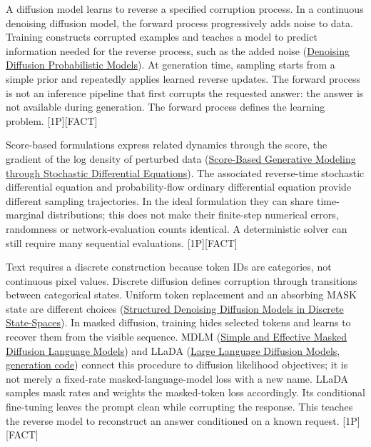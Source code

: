 A diffusion model learns to reverse a specified corruption process. In a
continuous denoising diffusion model, the forward process progressively
adds noise to data. Training constructs corrupted examples and teaches a
model to predict information needed for the reverse process, such as the
added noise (\href{https://arxiv.org/abs/2006.11239}{Denoising Diffusion
Probabilistic Models}). At generation time, sampling starts from a
simple prior and repeatedly applies learned reverse updates. The forward
process is not an inference pipeline that first corrupts the requested
answer: the answer is not available during generation. The forward
process defines the learning problem. \mbox{{[}1P{]}}\hspace{0pt}\mbox{{[}FACT{]}}

Score-based formulations express related dynamics through the score, the
gradient of the log density of perturbed data
(\href{https://arxiv.org/abs/2011.13456}{Score-Based Generative Modeling
through Stochastic Differential Equations}). The associated reverse-time
stochastic differential equation and probability-flow ordinary
differential equation provide different sampling trajectories. In the
ideal formulation they can share time-marginal distributions; this does
not make their finite-step numerical errors, randomness or
network-evaluation counts identical. A deterministic solver can still
require many sequential evaluations. \mbox{{[}1P{]}}\hspace{0pt}\mbox{{[}FACT{]}}

Text requires a discrete construction because token IDs are categories,
not continuous pixel values. Discrete diffusion defines corruption
through transitions between categorical states. Uniform token
replacement and an absorbing MASK state are different choices
(\href{https://arxiv.org/abs/2107.03006}{Structured Denoising Diffusion
Models in Discrete State-Spaces}). In masked diffusion, training hides
selected tokens and learns to recover them from the visible sequence.
MDLM (\href{https://arxiv.org/abs/2406.07524}{Simple and Effective
Masked Diffusion Language Models}) and LLaDA
(\href{https://arxiv.org/abs/2502.09992}{Large Language Diffusion
Models}, \href{https://github.com/ML-GSAI/LLaDA}{generation code})
connect this procedure to diffusion likelihood objectives; it is not
merely a fixed-rate masked-language-model loss with a new name. LLaDA
samples mask rates and weights the masked-token loss accordingly. Its
conditional fine-tuning leaves the prompt clean while corrupting the
response. This teaches the reverse model to reconstruct an answer
conditioned on a known request. \mbox{{[}1P{]}}\hspace{0pt}\mbox{{[}FACT{]}}

